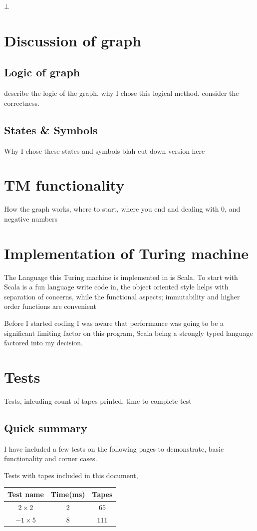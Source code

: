 \documentclass[11pt]{article}
\begin{document}
$\bot$

\section{Discussion of graph}
\subsection{Logic of graph}
describe the logic of the graph, why I chose this logical method. consider the correctness.



\subsection{States \& Symbols}
Why I chose these states and symbols
blah
cut down version here

\section{TM functionality}
How the graph works, where to start, where you end and dealing with 0, and negative numbers

\section{Implementation of Turing machine}

The Language this Turing machine is implemented in is Scala. To start with Scala is a fun language write code in, the object oriented style helps with separation of concerns, while the functional aspects; immutability and higher order functions are convenient 

Before I started coding I was aware that performance was going to be a significant limiting factor on this program, Scala being a strongly typed language factored into my decision.

\section{Tests}
Tests, inlcuding count of tapes printed, time to complete test
\subsection{Quick summary}
I have included a few tests on the following pages to demonstrate, basic functionality and corner cases.

\begin{table}[H]
\centering

Tests with tapes included in this document,  \\
\begin{tabular}{|c|c|c|}
\hline
Test name & Time(ms) & Tapes\\ \hline
$2 \times 2$ & $2$ & $65$ \\ \hline
$-1 \times 5$ & $8$ & $111$ \\ \hline
\end{tabular}
\end{table}
\end{document}
